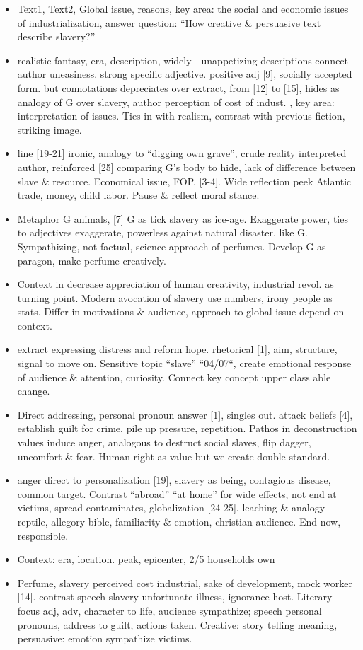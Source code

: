 \documentclass[a4paper,12pt]{article}
\begin{document}
\begin{itemize}
 \item Text1, Text2, Global issue, reasons, key area: the social and economic issues of industrialization, answer question: ``How creative \& persuasive text describe slavery?''
 \item realistic fantasy, era, description, widely - unappetizing descriptions connect author uneasiness.
 strong specific adjective. positive adj [9], socially accepted form. but connotations depreciates over extract, from [12] to [15], hides as analogy of G over slavery, author perception of cost of indust. , key area: interpretation of issues. Ties in with realism, contrast with previous fiction, striking image.
 \item line [19-21] ironic, analogy to ``digging own grave'', crude reality interpreted author, reinforced [25] comparing G's body to hide, lack of difference between slave \& resource. Economical issue, FOP, [3-4]. Wide reflection peek Atlantic trade, money, child labor. Pause \& reflect moral stance.
 \item Metaphor G animals, [7] G as tick slavery as ice-age. Exaggerate power, ties to adjectives exaggerate, powerless against natural disaster, like G. Sympathizing, not factual, science approach of perfumes. Develop G as paragon, make perfume creatively.
 \item Context in decrease appreciation of human creativity, industrial revol. as turning point. Modern avocation of slavery use numbers, irony people as stats. Differ in motivations \& audience, approach to global issue depend on context.

 \item extract expressing distress and reform hope. rhetorical [1], aim, structure, signal to move on. Sensitive topic ``slave'' ``04/07``, create emotional response of audience \& attention, curiosity. Connect key concept upper class able change.
 \item Direct addressing, personal pronoun answer [1], singles out. attack beliefs [4], establish guilt for crime, pile up pressure, repetition. Pathos in deconstruction values induce anger, analogous   to destruct social slaves, flip dagger, uncomfort \& fear. Human right as value but we create double standard.
 \item anger direct to personalization [19], slavery as being, contagious disease, common target. Contrast ``abroad'' ``at home'' for wide effects, not end at victims, spread  contaminates, globalization [24-25].  leaching \& analogy reptile, allegory bible, familiarity \& emotion, christian audience. End now, responsible.
 \item Context: era, location. peak, epicenter, 2/5 households own

 \item Perfume, slavery perceived cost industrial, sake of development, mock worker [14]. contrast speech slavery unfortunate illness, ignorance host. Literary focus adj, adv, character to life, audience sympathize; speech personal pronouns, address to guilt, actions taken. Creative: story telling meaning, persuasive: emotion sympathize victims.
\end{itemize}
\end{document}
